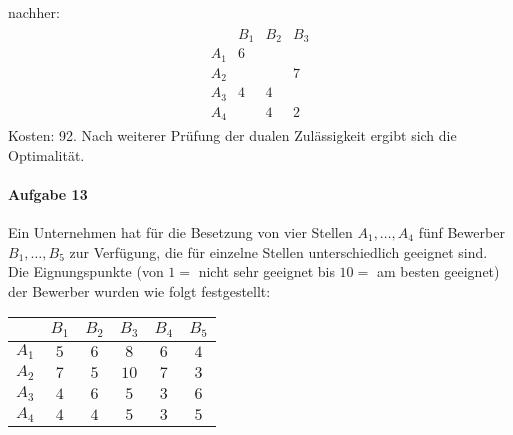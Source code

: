 \documentclass[
a4paper, %
11pt,
]
{scrartcl}
\begin{document}
\begin{enumerate}[(a)]
\begin{minipage}[t]{0.4\textwidth}
\begin{center}
      \end{center}
    \end{minipage}
    \begin{minipage}[t]{0.2\textwidth}
      nachher:
      \begin{align*}
        \begin{matrix}
              & B_1 & B_2 & B_3\\
          A_1 & 6   &     & \\
          A_2 &     &     & 7\\
          A_3 & 4   & 4   & \\
          A_4 &     & 4   & 2
        \end{matrix}
      \end{align*}
      Kosten: 92. Nach weiterer Prüfung der dualen Zulässigkeit ergibt sich die
      Optimalität.
    \end{minipage}
\end{enumerate}

\paragraph{Aufgabe 13}%
\label{par:aufgabe_13}

Ein Unternehmen hat für die Besetzung von vier Stellen $A_1, \ldots, A_4$ fünf
Bewerber $B_1, \ldots, B_5$ zur Verfügung, die für einzelne Stellen
unterschiedlich geeignet sind. Die Eignungspunkte (von $1 = $ nicht sehr
geeignet bis $10 =$ am besten geeignet) der Bewerber wurden wie folgt
festgestellt:
\begin{center}
  \begin{tabular}{c|ccccc}
           & $B_1$ & $B_2$ & $B_3$ & $B_4$ & $B_5$\\
    \midrule
    $A_1$  & $5$   & $6$   & $8$   & $6$   & $4$\\
    $A_2$  & $7$   & $5$   & $10$  & $7$   & $3$\\
    $A_3$  & $4$   & $6$   & $5$   & $3$   & $6$\\
    $A_4$  & $4$   & $4$   & $5$   & $3$   & $5$\\
  \end{tabular}
\end{center}
\end{document}

